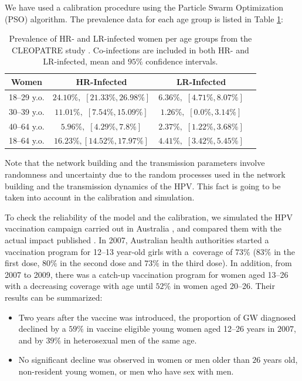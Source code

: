 We have used a calibration procedure using the Particle Swarm Optimization (PSO) algorithm. The prevalence data for each age group is listed in Table \ref{datos}:

\begin{table}[H]
	\centering
	\caption{Prevalence of {HR- and LR}-infected women per age groups from the 
		CLEOPATRE study \protect\cite{CLEOPATRE}. Co-infections are included in both HR- and LR-infected, mean and $95\%$ confidence intervals.}
	\begin{tabular}{cccc}
		\toprule
		\textbf{Women} & \textbf{HR-Infected} & \textbf{LR-Infected} \\
		\midrule
		18--29 y.o. & $24.10\%,$ $[21.33\%, 26.98\%]$ & $6.36\%,$ $[4.71\%, 8.07\%]$ \\
		30--39 y.o. & $11.01\%,$ $[7.54\%, 15.09\%]$ & $1.26\%,$ $[0.0\%, 3.14\%]$ \\
		40--64 y.o. & $5.96\%,$ $[4.29\%, 7.8\%]$ & $2.37\%,$ $[1.22\%, 3.68\%]$ \\
		\midrule
		18--64 y.o. & $16.23\%,$$[14.52\%, 17.97\%]$ & $4.41\%,$ $[3.42\%, 5.45\%]$ \\
		\bottomrule
	\end{tabular}
	\label{datos}
\end{table}

Note that the network building and the transmission parameters involve randomness and uncertainty due to the random processes used in the network building and the transmission dynamics of the HPV. This fact is going to be taken into account in the  calibration and simulation.

To check the reliability of the model and the calibration, we simulated the HPV vaccination campaign carried out in Australia \cite{Ali}, and compared them with the actual impact published \cite{Ali}. In 2007, Australian health authorities started a vaccination program for 12--13 year-old girls with a~coverage of $73\%$ ($83\%$ in the first dose, $80\%$ in the second dose and $73\%$ in the third dose). In addition, from 2007 to 2009, there was a catch-up vaccination program for women aged 13--26 with a decreasing coverage with age until $52\%$ in women aged 20--26. Their results can be summarized:

\begin{itemize}[leftmargin=*,labelsep=5mm]
\item Two years after the vaccine was introduced, the proportion of GW diagnosed declined by a $59\%$ in vaccine eligible young women aged 12--26 years in $2007$, and by $39\%$ in heterosexual men of the same age.
\item No significant decline was observed in women or men older than $26$ years old, non-resident young women, or men who have sex with men.
\end{itemize}

